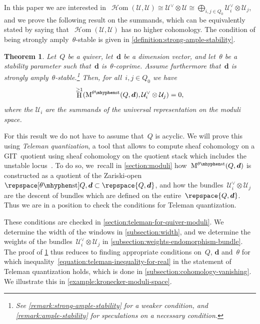 \documentclass[JEP,XML,SOM,Unicode,NoEqCountersInSection,published]{cedram}
\theoremstyle{plain}
\newtheorem{alphatheorem}{Theorem}
\theoremstyle{definition}
\DeclareMathOperator\HH{H}
\DeclareMathOperator\sheafHom{\mathcal{H}om}
\newcommand\dash{\nobreakdash-\hspace{0pt}}
\newcommand\moduli{\ensuremath{\mathrm{M}}}
\newcommand\stable{\ensuremath{\mhyphen\mathrm{st}}}
\newcommand\tuple[1]{\ensuremath{{\boldsymbol{#1}}}}
\begin{document}
In this paper
we are interested in~$\sheafHom(\mathcal{U},\mathcal{U})\cong\mathcal{U}^\vee\otimes\mathcal{U}\cong\bigoplus_{i,j\in Q_0}\mathcal{U}_i^\vee\otimes\mathcal{U}_j$,
and we prove the following result on the summands,
which can be equivalently stated by saying that~$\sheafHom(\mathcal{U},\mathcal{U})$
has no higher cohomology.
The condition of being strongly amply~$\theta$-stable
is given in \cref{definition:strong-ample-stability}.

\begin{alphatheorem}
\label{theorem:cohomology-vanishing}
Let~$Q$ be a quiver,
let~$\tuple{d}$ be a dimension vector,
and let~$\theta$ be a stability parameter
such that~$\tuple{d}$ is~$\theta$\dash coprime.
Assume furthermore that~$\tuple{d}$ is strongly amply~$\theta$\dash stable.\footnote{See \cref{remark:strong-ample-stability} for a weaker condition,
and \cref{remark:ample-stability} for speculations on a necessary condition.}
Then, for all~$i,j \in Q_0$ we have
\begin{equation}
\label{equation:cohomology-vanishing}
\HH^{\geq1}(\moduli^{\theta\stable}(Q,\tuple{d}), \mathcal{U}^\vee_i \otimes \mathcal{U}_j) = 0,
\end{equation}
where the $\mathcal{U}_i$ are the summands of
the universal representation on the moduli space.
\end{alphatheorem}

For this result we do not have to assume that~$Q$ is acyclic.
We will prove this using \emph{Teleman quantization},
a tool that allows to compute sheaf cohomology on a GIT~quotient
using sheaf cohomology on the quotient stack which includes the unstable locus~\cite{MR1792291}.
To do so, we~recall in \cref{section:moduli}
how~$\moduli^{\theta\stable}(Q,\tuple{d})$ is constructed as a quotient
of the Zariski-open~$\repspace[\theta\stable]{Q,\tuple{d}}\subset\repspace{Q,\tuple{d}}$,
and how the bundles~$\mathcal{U}_i^\vee\otimes\mathcal{U}_j$ are the descent
of bundles which are defined on the entire~$\repspace{Q,\tuple{d}}$.
Thus we are in a position to check the conditions for Teleman quantization.

These conditions are checked in \cref{section:teleman-for-quiver-moduli}.
We determine the width of the windows in \cref{subsection:width},
and we determine the weights of the bundles~$\mathcal{U}_i^\vee\otimes\mathcal{U}_j$ in \cref{subsection:weights-endomorphism-bundle}.
The proof of \cref{theorem:cohomology-vanishing}
thus reduces to finding appropriate conditions on~$Q$, $\tuple{d}$ and~$\theta$
for which inequality~\eqref{equation:teleman-inequality-for-real} in the statement of Teleman quantization holds,
which is done in \cref{subsection:cohomology-vanishing}.
We illustrate this in \cref{example:kronecker-moduli-space}.
\end{document}
